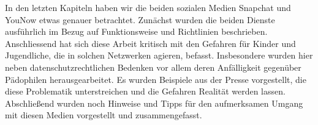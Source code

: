 In den letzten Kapiteln haben wir die beiden sozialen Medien Snapchat und
YouNow etwas genauer betrachtet. Zun\"achst wurden die beiden Dienste
ausf\"uhrlich im Bezug auf Funktionsweise und Richtlinien beschrieben.
Anschliessend hat sich diese Arbeit kritisch mit den Gefahren f\"ur Kinder und
Jugendliche, die in solchen Netzwerken agieren, befasst. Insbesondere wurden
hier neben datenschutzrechtlichen Bedenken vor allem deren Anf\"alligkeit
gegen\"uber P\"adophilen herausgearbeitet. Es wurden Beispiele aus der Presse
vorgestellt, die diese Problematik unterstreichen und die Gefahren Realit\"at
werden lassen. Abschlie{\ss}end wurden noch Hinweise und Tipps f\"ur den
aufmerksamen Umgang mit diesen Medien vorgestellt und zusammengefasst.
